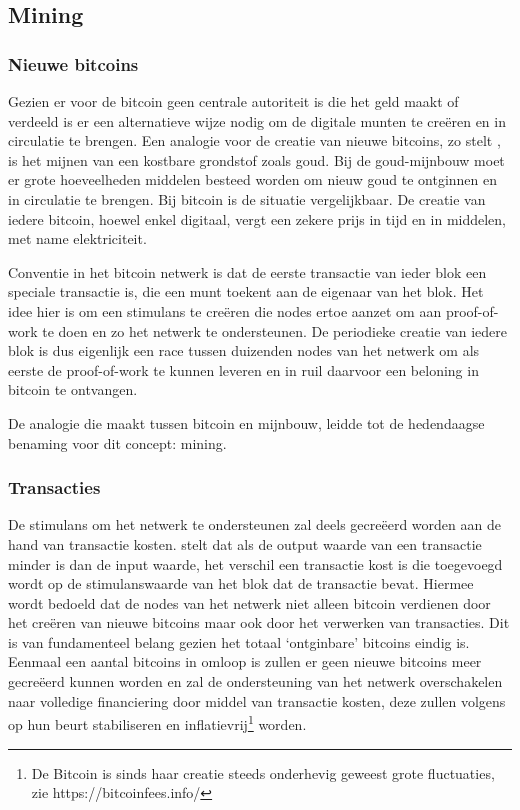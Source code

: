 	\subsection{Mining}
		\subsubsection{Nieuwe bitcoins}
		Gezien er voor de bitcoin geen centrale autoriteit is die het geld maakt of verdeeld is er een alternatieve wijze nodig om de digitale munten te creëren en in circulatie te brengen. Een analogie voor de creatie van nieuwe bitcoins, zo stelt \textcite{Nakamoto2008}, is het mijnen van een kostbare grondstof zoals goud. Bij de goud-mijnbouw moet er grote hoeveelheden middelen besteed worden om nieuw goud te ontginnen en in circulatie te brengen. Bij bitcoin is de situatie vergelijkbaar. De creatie van iedere bitcoin, hoewel enkel digitaal, vergt een zekere prijs in tijd en in middelen, met name elektriciteit.
		
		Conventie in het bitcoin netwerk is dat de eerste transactie van ieder blok een speciale transactie is, die een munt toekent aan de eigenaar van het blok. Het idee hier is om een stimulans te creëren die nodes ertoe aanzet om aan proof-of-work te doen en zo het netwerk te ondersteunen. De periodieke creatie van iedere blok is dus eigenlijk een race tussen duizenden nodes van het netwerk om als eerste de proof-of-work te kunnen leveren en in ruil daarvoor een beloning in bitcoin te ontvangen. 
		
		De analogie die \textcite{Nakamoto2008} maakt tussen bitcoin en mijnbouw, leidde tot de hedendaagse benaming voor dit concept: mining. 
		
		\subsubsection{Transacties}
		De stimulans om het netwerk te ondersteunen zal deels gecreëerd worden aan de hand van transactie kosten. \textcite{Nakamoto2008} stelt dat als de output waarde van een transactie minder is dan de input waarde, het verschil een transactie kost is die toegevoegd wordt op de stimulanswaarde van het blok dat de transactie bevat. Hiermee wordt bedoeld dat de nodes van het netwerk niet alleen bitcoin verdienen door het creëren van nieuwe bitcoins maar ook door het verwerken van transacties. Dit is van fundamenteel belang gezien het totaal ‘ontginbare’ bitcoins eindig is. Eenmaal een aantal bitcoins in omloop is zullen er geen nieuwe bitcoins meer gecreëerd kunnen worden en zal de ondersteuning van het netwerk overschakelen naar volledige financiering door middel van transactie kosten, deze zullen volgens \textcite{Nakamoto2008} op hun beurt stabiliseren en inflatievrij\footnote{De Bitcoin is sinds haar creatie steeds onderhevig geweest grote fluctuaties, zie https://bitcoinfees.info/} worden.
		
